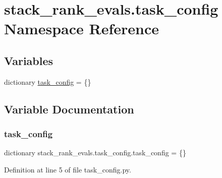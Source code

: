 \hypertarget{namespacestack__rank__evals_1_1task__config}{}\section{stack\+\_\+rank\+\_\+evals.\+task\+\_\+config Namespace Reference}
\label{namespacestack__rank__evals_1_1task__config}
\subsection*{Variables}
\begin{DoxyCompactItemize}
\item 
dictionary \hyperlink{namespacestack__rank__evals_1_1task__config_a64c0773e48edb590509b7d8951e63f6c}{task\+\_\+config} = \{\}
\end{DoxyCompactItemize}


\subsection{Variable Documentation}
\mbox{\label{namespacestack__rank__evals_1_1task__config_a64c0773e48edb590509b7d8951e63f6c}} 
\subsubsection{\texorpdfstring{task\+\_\+config}{task\_config}}
{\footnotesize\ttfamily dictionary stack\+\_\+rank\+\_\+evals.\+task\+\_\+config.\+task\+\_\+config = \{\}}



Definition at line 5 of file task\+\_\+config.\+py.


